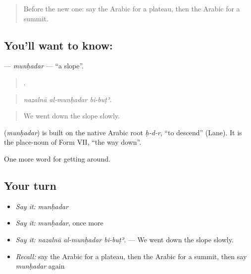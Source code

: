 \label{lesson:AR-C472-munhadar}



\begin{quote}
Before the new one: say the Arabic for a plateau, then the Arabic for a summit.
\end{quote}

\subsection*{You'll want to know: }
\textbf{} — \emph{munḥadar} — \textquotedblleft{}a slope\textquotedblright{}.

\begin{quote}
  .
\end{quote}

\begin{quote}
\emph{nazalnā al-munḥadar bi-buṭʾ.}
\end{quote}

\begin{quote}
We went down the slope slowly.
\end{quote}

\begin{cousinweb}
\textbf{} (\emph{munḥadar}) is built on the native Arabic root \emph{ḥ-d-r}, \textquotedblleft{}to descend\textquotedblright{} (Lane). It is the place-noun of Form VII, \textquotedblleft{}the way down\textquotedblright{}.
\end{cousinweb}

\begin{grammarlens}[title={What you've built}]
One more word for getting around.
\end{grammarlens}

\subsection*{Your turn}
\begin{itemize}
\raggedright
  \item \emph{Say it:} \emph{munḥadar}
  \item \emph{Say it:} \emph{munḥadar}, once more
  \item \emph{Say it:} \emph{nazalnā al-munḥadar bi-buṭʾ.} — We went down the slope slowly.
  \item \emph{Recall:} say the Arabic for a plateau, then the Arabic for a summit, then say \emph{munḥadar} again
\end{itemize}

